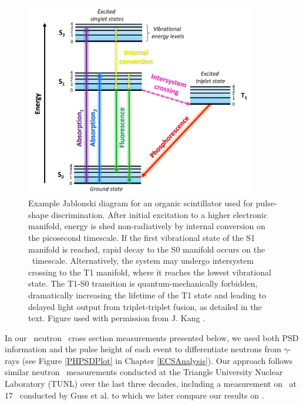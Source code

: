 \begin{figure}[tb]
    \centering
    \includegraphics[width = 0.9\textwidth]{figures/JablonskiExample_KangDissertation.png}
    \caption[Example Jablonski diagram for organic scintillator]
    {
        Example Jablonski diagram for an organic scintillator used for
        pulse-shape discrimination. After initial excitation to a higher
        electronic manifold, energy is shed non-radiatively by internal
        conversion on the picosecond timescale. If the first vibrational state of the S1
        manifold is reached, rapid decay to the S0 manifold occurs on the
        \nano\second\ timescale. Alternatively, the system may undergo intersystem
        crossing to the T1 manifold, where it reaches the lowest vibrational
        state. The T1-S0 transition is quantum-mechanically forbidden,
        dramatically increasing the lifetime of the T1 state and leading to
        delayed light output from triplet-triplet fusion, as detailed in the text.
        Figure used with permission 
        from J. Kang \cite{KangPhDThesis}. 
    }
    \label{JablonskiExample}
\end{figure}

In our \snTwelveFour\ neutron \el\ cross section measurements presented below,
we used both \gls{PSD} information and the pulse height of each event to
differentiate neutrons
from $\gamma$-rays (see Figure \ref{PHPSDPlot} in Chapter
\ref{ECSAnalysis}). Our approach follows similar neutron \el\ measurements
conducted at the Triangle University Nuclear Laboratory (\gls{TUNL}) over the last three decades,
including a measurement on \snTwenty\ at 17 \mega\electronvolt\ conducted by Guss et al.
\cite{Guss1989, GussPhDThesis} to which we later compare our results on
\snTwelveFour.

